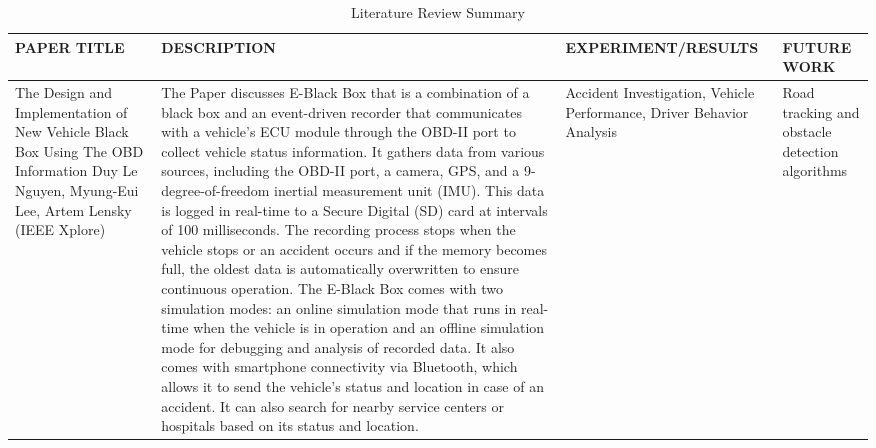 \begin{longtable}{|p{}|p{}|p{}|p{}|}
\caption{Literature Review Summary\label{tab:literature-review}} \\
\hline
\textbf{\small PAPER \newline TITLE} & \textbf{\small DESCRIPTION} & \textbf{\small EXPERIMENT/\newline RESULTS} & \textbf{\small FUTURE WORK} \\
\hline
\endfirsthead

\endhead

\endfoot

\hline
\endlastfoot
The Design and Implementation of New Vehicle Black Box Using The OBD Information
\newline
{\small Duy Le Nguyen, Myung-Eui Lee, Artem Lensky}
\newline
{\small (IEEE Xplore)} & 
{\small The Paper discusses E-Black Box that is a combination of a black box and an event-driven recorder that communicates with a vehicle's ECU module through the OBD-II port to collect vehicle status information. It gathers data from various sources, including the OBD-II port, a camera, GPS, and a 9-degree-of-freedom inertial measurement unit (IMU).
\newline
This data is logged in real-time to a Secure Digital (SD) card at intervals of 100 milliseconds. The recording process stops when the vehicle stops or an accident occurs and if the memory becomes full, the oldest data is automatically overwritten to ensure continuous operation.}
\newline
The E-Black Box comes with two simulation modes: an online simulation mode that runs in real-time when the vehicle is in operation and an offline simulation mode for debugging and analysis of recorded data. It also comes with smartphone connectivity via Bluetooth, which allows it to send the vehicle's status and location in case of an accident. It can also search for nearby service centers or hospitals based on its status and location. & 
Accident Investigation,
Vehicle Performance,
Driver Behavior Analysis & 
Road tracking and obstacle detection algorithms \\
\hline


\end{longtable}
